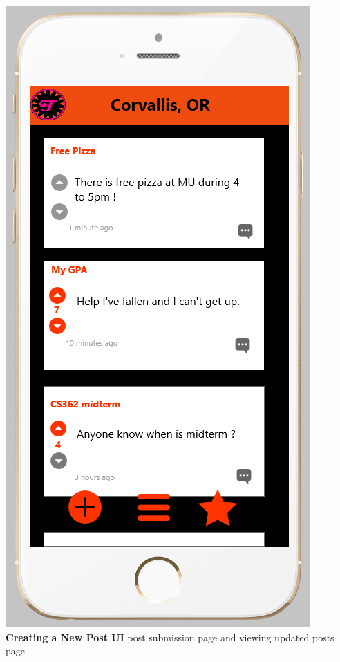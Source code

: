\documentclass[12pt]{article}
\begin{document}
\begin{center}
\includegraphics[scale=0.30]{img/ui/post-review}\linebreak
\textbf{Creating a New Post UI}\linebreak
post submission page and viewing updated posts page
  \end{center}
\end{document}
